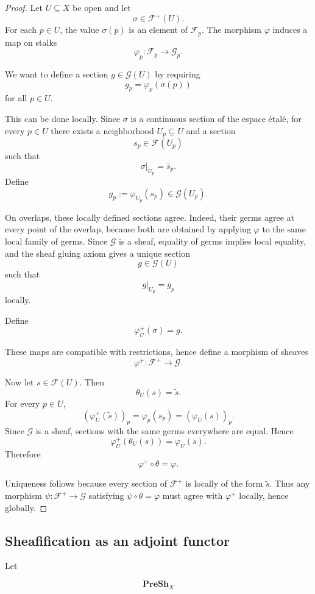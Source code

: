 \documentclass[12pt,a4paper]{article}
\newcommand{\PreSh}{\mathbf{PreSh}}
\theoremstyle{notespace}
\begin{document}
\begin{proof}
	Let $U \subseteq X$ be open and let
	\[
	\sigma \in \mathcal F^+(U).
	\]
	For each $p \in U$, the value $\sigma(p)$ is an element of $\mathcal F_p$.
	The morphism $\varphi$ induces a map on stalks
	\[
	\varphi_p : \mathcal F_p \longrightarrow \mathcal G_p.
	\]
	
	We want to define a section $g \in \mathcal G(U)$ by requiring
	\[
	g_p=\varphi_p(\sigma(p))
	\]
	for all $p \in U$.
	
	This can be done locally.
	Since $\sigma$ is a continuous section of the espace \'{e}tal\'{e}, for every
	$p \in U$ there exists a neighborhood $U_p \subseteq U$ and a section
	\[
	s_p \in \mathcal F(U_p)
	\]
	such that
	\[
	\sigma|_{U_p}=\widetilde{s_p}.
	\]
	Define
	\[
	g_p := \varphi_{U_p}(s_p) \in \mathcal G(U_p).
	\]
	
	On overlaps, these locally defined sections agree.
	Indeed, their germs agree at every point of the overlap, because both are
	obtained by applying $\varphi$ to the same local family of germs.
	Since $\mathcal G$ is a sheaf, equality of germs implies local equality, and
	the sheaf gluing axiom gives a unique section
	\[
	g \in \mathcal G(U)
	\]
	such that
	\[
	g|_{U_p}=g_p
	\]
	locally.
	
	Define
	\[
	\varphi_U^+(\sigma)=g.
	\]
	
	These maps are compatible with restrictions, hence define a morphism of sheaves
	\[
	\varphi^+ : \mathcal F^+ \longrightarrow \mathcal G.
	\]
	
	Now let $s \in \mathcal F(U)$.
	Then
	\[
	\theta_U(s)=\widetilde{s}.
	\]
	For every $p \in U$,
	\[
	(\varphi_U^+(\widetilde{s}))_p
	=
	\varphi_p(s_p)
	=
	(\varphi_U(s))_p.
	\]
	Since $\mathcal G$ is a sheaf, sections with the same germs everywhere are
	equal. Hence
	\[
	\varphi_U^+(\theta_U(s))=\varphi_U(s).
	\]
	Therefore
	\[
	\varphi^+ \circ \theta=\varphi.
	\]
	
	Uniqueness follows because every section of $\mathcal F^+$ is locally of the
	form $\widetilde{s}$.
	Thus any morphism $\psi:\mathcal F^+ \to \mathcal G$ satisfying
	$\psi \circ \theta=\varphi$ must agree with $\varphi^+$ locally, hence globally.
\end{proof}

\subsection{Sheafification as an adjoint functor}
Let

\[
\PreSh_X
\]
\end{document}
